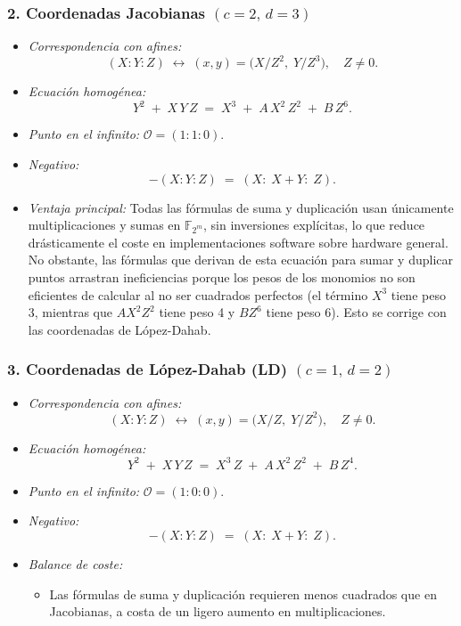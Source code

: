 \subsubsection*{2. Coordenadas Jacobianas \((c=2,\,d=3)\)}

\begin{itemize}
  \item \emph{Correspondencia con afines:}
  \[
    (X:Y:Z)\;\longleftrightarrow\;(x,y)=\bigl(X/Z^2,\;Y/Z^3\bigr),\quad Z\neq0.
  \]
  \item \emph{Ecuación homogénea:}
  \[
    Y^2 \;+\; X\,Y\,Z \;=\; X^3 \;+\; A\,X^2\,Z^2 \;+\; B\,Z^6.
  \]
  \item \emph{Punto en el infinito:} \(\mathcal{O} = (1:1:0)\).  
  \item \emph{Negativo:} 
  \[
    -(X:Y:Z) \;=\; (X:\;X+Y:\;Z).
  \]
  \item \emph{Ventaja principal:} Todas las fórmulas de suma y duplicación usan únicamente multiplicaciones y sumas en \(\mathbb{F}_{2^m}\), sin inversiones explícitas, lo que reduce drásticamente el coste en implementaciones software sobre hardware general. No obstante, las fórmulas que derivan de esta ecuación para sumar y duplicar puntos arrastran ineficiencias porque los pesos de los monomios no son eficientes de calcular al no ser cuadrados perfectos (el término \(X^3\) tiene peso 3, mientras que \(A X^2 Z^2\) tiene peso 4 y \(B Z^6\) tiene peso 6). Esto se corrige con las coordenadas de López-Dahab.
\end{itemize}

\subsubsection*{3. Coordenadas de López-Dahab (LD) \((c=1,\,d=2)\)}

\begin{itemize}
  \item \emph{Correspondencia con afines:}
  \[
    (X:Y:Z)\;\longleftrightarrow\;(x,y)=\bigl(X/Z,\;Y/Z^2\bigr),\quad Z\neq0.
  \]
  \item \emph{Ecuación homogénea:}
  \[
    Y^2 \;+\; X\,Y\,Z \;=\; X^3\,Z \;+\; A\,X^2\,Z^2 \;+\; B\,Z^4.
  \]
  \item \emph{Punto en el infinito:} \(\mathcal{O} = (1:0:0)\).  
  \item \emph{Negativo:} 
  \[
    -(X:Y:Z) \;=\; (X:\;X+Y:\;Z).
  \]
  \item \emph{Balance de coste:}  
    \begin{itemize}
      \item Las fórmulas de suma y duplicación requieren menos cuadrados que en Jacobianas, a costa de un ligero aumento en multiplicaciones.
    \end{itemize}
\end{itemize}

